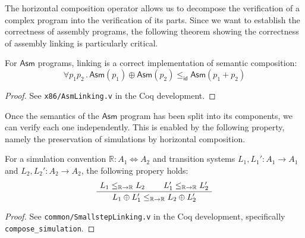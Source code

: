 \documentclass[sigplan,10pt,review,anonymous]{acmart}\settopmatter{printfolios=true,printccs=false,printacmref=false}
\newcommand{\kw}[1]{\ensuremath{ \mathsf{#1} }}
\begin{document}
The horizontal composition operator
allows us to decompose the verification of a complex program
into the verification of its parts.
Since we want to
establish the correctness of assembly programs,
the following theorem showing the correctness
of assembly linking is particularly critical.

\begin{theorem} \label{thm:asmlinking} %
For \kw{Asm} programs,
linking is a correct implementation of
semantic composition:
\[
    \forall p_1 p_2 \,.\,
      \kw{Asm}(p_1) \oplus \kw{Asm}(p_2)
      \le_\kw{id}
      \kw{Asm}(p_1 + p_2)
\]
\begin{proof}
See \texttt{x86/AsmLinking.v} in the Coq development.
\end{proof}
\end{theorem}

Once the semantics of the \kw{Asm} program
has been split into its components,
we can verify each one independently.
This is enabled by the following property,
namely the preservation of simulations by
horizontal composition.

\begin{theorem} \label{thm:simlinking} %
For a simulation convention
$\mathbb{R} : A_1 \Leftrightarrow A_2$
and transition systems
$L_1, L_1' : A_1 \rightarrow A_1$ and
$L_2, L_2' : A_2 \rightarrow A_2$,
the following propery holds:
\[
    \AxiomC{$L_1 \le_{\mathbb{R} \rightarrow \mathbb{R}} L_2$}
    \AxiomC{$L_1' \le_{\mathbb{R} \rightarrow \mathbb{R}} L_2'$}
    \BinaryInfC{$L_1 \oplus L_1' \le_{\mathbb{R} \rightarrow \mathbb{R}} L_2 \oplus L_2'$}
    \DisplayProof
\]
\begin{proof}
See \texttt{common/SmallstepLinking.v}
in the Coq development,
specifically \texttt{compose\_simulation}.
\end{proof}
\end{theorem}


%
%
%
\end{document}
